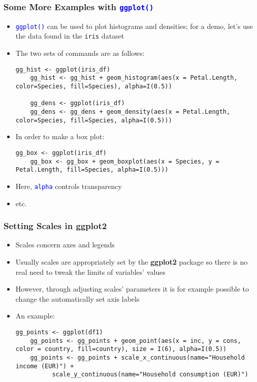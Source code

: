 \documentclass[10pt]{beamer}
\newcommand{\cc}[1]{\texttt{\textcolor{blue}{#1}}}
\theoremstyle{definition}
\begin{document}
\begin{frame}[fragile]
\frametitle{Some More Examples with \cc{ggplot()}}
\begin{itemize}
	\item \cc{ggplot()} can be used to plot histograms and densities; for a demo, let's use the data found in the \texttt{iris} dataset
	\item The two sets of commands are as follows:
	\begin{lstlisting}[style = rstyle, breaklines]
	gg_hist <- ggplot(iris_df)
	gg_hist <- gg_hist + geom_histogram(aes(x = Petal.Length, color=Species, fill=Species), alpha=I(0.5))
		
	gg_dens <- ggplot(iris_df)
	gg_dens <- gg_dens + geom_density(aes(x = Petal.Length, color=Species, fill=Species, alpha=I(0.5)))
	\end{lstlisting}
	\item In order to make a box plot:
	\begin{lstlisting}[style = rstyle, breaklines]
	gg_box <- ggplot(iris_df)
	gg_box <- gg_box + geom_boxplot(aes(x = Species, y = Petal.Length, fill=Species, alpha=I(0.5)))
	\end{lstlisting}
	\item Here, \cc{alpha} controls transparency
	\item etc.
\end{itemize}
\end{frame}

\begin{frame}[fragile]
\frametitle{Setting Scales in \textbf{ggplot2}}
\begin{itemize}
	\item Scales concern axes and legends
	\item Usually scales are appropriately set by the \textbf{ggplot2} package so there is no real need to tweak the limits of variables' values
	\item However, through adjusting scales' parameters it is for example possible to change the automatically set axis labels
	\item An example:
	\begin{lstlisting}[style = rstyle, breaklines]
	gg_points <- ggplot(df1)
	gg_points <- gg_points + geom_point(aes(x = inc, y = cons, color = country, fill=country), size = I(6), alpha=I(0.5))
	gg_points <- gg_points + scale_x_continuous(name="Household income (EUR)") + 
          scale_y_continuous(name="Household consumption (EUR)") 
	\end{lstlisting}		
\end{itemize}
\end{frame}
\end{document}

